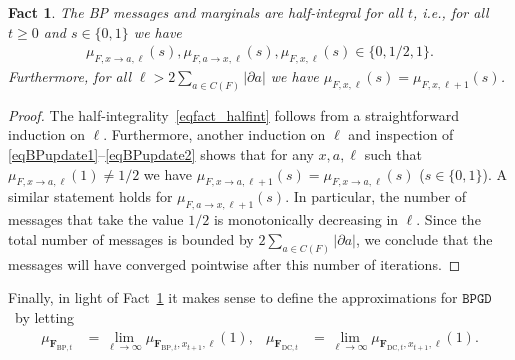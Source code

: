 \documentclass[10pt,reqno]{amsart}
\numberwithin{equation}{section}
\renewcommand{\vec}[1]{\boldsymbol{#1}}
\newcommand{\FBP}[1]{\PHI_{\mathrm{BP},{#1}}}
\newcommand{\FDC}[1]{\PHI_{\mathrm{DC},{#1}}}
\newcommand{\BPGD}{\ensuremath{\mathtt{BPGD}}}
\newcommand\PHI{\vec F}
\newtheorem{fact}[definition]{Fact}
\begin{document}
\begin{fact}\label{fact_halfint}
	The BP messages and marginals are half-integral for all $t$, i.e., for all $t\geq0$ and $s\in\{0,1\}$ we have
	\begin{align}\label{eqfact_halfint}
			\mu_{F,x\to a,\ell}(s),\mu_{F,a\to x,\ell}(s),\mu_{F,x,\ell}(s)\in\{0,1/2,1\}.
		\end{align}
		Furthermore, for all $\ell>2\sum_{a\in C(F)}|\partial a|$ we have $\mu_{F,x,\ell}(s)=\mu_{F,x,\ell+1}(s)$.
\end{fact}
\begin{proof}
	The half-integrality~\eqref{eqfact_halfint} follows from a straightforward induction on $\ell$.
	Furthermore, another induction on $\ell$ and inspection of \eqref{eqBPupdate1}--\eqref{eqBPupdate2} shows that for any $x,a,\ell$ such that $\mu_{F,x\to a,\ell}(1)\neq1/2$ we have $\mu_{F,x\to a,\ell+1}(s)=\mu_{F,x\to a,\ell}(s)$ ($s\in\{0,1\}$).
	A similar statement holds for $\mu_{F,a\to x,\ell+1}(s)$.
	In particular, the number of messages that take the value $1/2$ is monotonically decreasing in $\ell$.
	Since the total number of messages is bounded by $2\sum_{a\in C(F)}|\partial a|$, we conclude that the messages will have converged pointwise after this number of iterations.
\end{proof}

\noindent
Finally, in light of Fact~\ref{fact_halfint} it makes sense to define the approximations for \BPGD\ by letting
\begin{align}\label{eqmuBPGD}
	\mu_{\FBP t}&=\lim_{\ell\to\infty}\mu_{\FBP t,x_{t+1},\ell}(1),&
	\mu_{\FDC t}&=\lim_{\ell\to\infty}\mu_{\FDC t,x_{t+1},\ell}(1).
\end{align}
\end{document}
